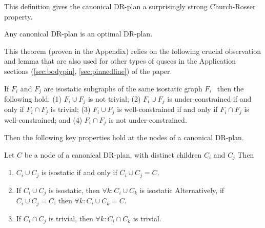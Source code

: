 This definition gives the canonical DR-plan a surprisingly strong Church-Rosser property.

\begin{theorem} \label{theorem:canonical_is_optimal}
    \label{theorem:main}
    Any canonical DR-plan is an optimal DR-plan.
\end{theorem}




This theorem (proven in the Appendix) relies on the following crucial observation and lemma
that are also used for other types of qusecs in the Application sections (\ref{sec:bodypin}, \ref{sec:pinnedline}) of
the paper.

\begin{observation}\label{lemma:union_intersection}
If $F_i$ and $F_j$ are isostatic subgraphs of the same
isostatic graph $F$, \
then the following hold:
(1) $F_i\cup F_j$ is not trivial;
(2) $F_i\cup F_j$ is under-constrained if and only if $F_i\cap F_j$ is trivial;
(3) $F_i\cup F_j$ is well-constrained if and only if $F_i\cap F_j$ is well-constrained; and
(4) $F_i\cap F_j$ is not under-constrained.
\end{observation}

Then the following key properties hold at the nodes of a canonical DR-plan.

\begin{lemma}\label{lemma:combined_lemma}
Let $C$ be a node of a canonical DR-plan, with distinct children $C_i$ and $C_j$
Then
\begin{enumerate}
    \item\label{lemma:wc_intersection_is_C}
    $C_i\cup C_j$ is isostatic if and only if $C_i\cup C_j = C$.

    \item\label{lemma:wc_intersection_makes_all_wc}
    If $C_i\cup C_j$ is isostatic, then $\forall k: C_i\cup C_k$ is isostatic Alternatively, if $C_i\cup C_j=C$, then $\forall k: C_i\cup C_k=C$.

    \item\label{lemma:uc_intersection_makes_all_uc}
    If $C_i\cap C_j$ is trivial, then $\forall k: C_i\cap C_k$ is trivial.
\end{enumerate}
\end{lemma}

